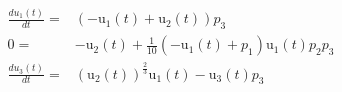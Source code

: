 \begin{align}
\frac{du_1(t)}{dt} =& \left(  - \mathrm{u_1}\left( t \right) + \mathrm{u_2}\left( t \right) \right) p_3 \\
0 =&  - \mathrm{u_2}\left( t \right) + \frac{1}{10} \left(  - \mathrm{u_1}\left( t \right) + p_1 \right) \mathrm{u_1}\left( t \right) p_2 p_3 \\
\frac{du_3(t)}{dt} =& \left( \mathrm{u_2}\left( t \right) \right)^{\frac{2}{3}} \mathrm{u_1}\left( t \right) - \mathrm{u_3}\left( t \right) p_3
\end{align}
